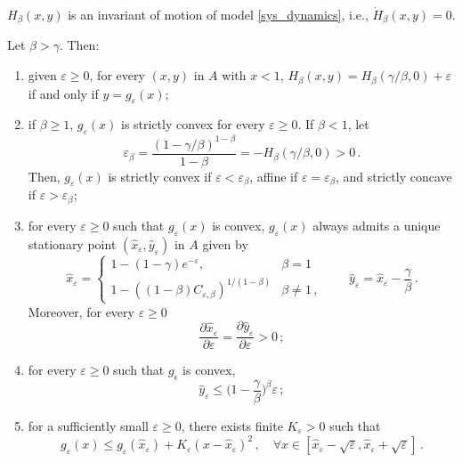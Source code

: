 \documentclass[10pt,a4paper]{amsart}
\begin{document}
\begin{proposition}\label{prop:H}
    $H_{\beta}(x,y)$ is an invariant of motion of model \eqref{sys_dynamics}, i.e., $\dot H_\beta(x,y) = 0$.
\end{proposition}

\begin{lemma}\label{lemma:g}
Let $\beta > \gamma$. Then: 
\begin{enumerate}
    \item[(i)] given $\varepsilon \ge 0$, for every $(x,y)$ in $A$ with $x < 1$, $H_\beta(x,y) = H_\beta(\gamma/\beta,0) + \varepsilon$ if and only if $y = g_\varepsilon(x)$;

    \item[(ii)] if $\beta \ge 1$, $g_\varepsilon(x)$ is strictly convex for every $\varepsilon \ge 0$. If $\beta < 1$, let
    $$
    \varepsilon_\beta = \frac{(1-\gamma/\beta)^{1-\beta}}{1-\beta} = -H_\beta(\gamma/\beta,0)>0\,.
    $$
Then, $g_\varepsilon(x)$ is strictly convex if $\varepsilon< \varepsilon_\beta$, affine if $\varepsilon = \varepsilon_\beta$, and strictly concave if $\varepsilon > \varepsilon_\beta$;

    \item[(iii)]
    for every $\varepsilon \ge 0$ such that $g_\varepsilon(x)$ is convex, $g_\varepsilon(x)$ always admits a unique stationary point $(\hat x_\varepsilon,\hat y_\varepsilon)$ in $A$ given by
    \begin{equation}\label{eq:xy}    
        \hat{x}_{\varepsilon} =\begin{cases}
        1 - (1 - \gamma)e^{- \varepsilon}, & \beta = 1\\
        1-((1-\beta)C_{\varepsilon,\beta})^{1/(1-\beta)}
        & \beta \neq 1\,,
        \end{cases}\qquad \hat{y}_{\varepsilon} = \hat x_\varepsilon - \frac{\gamma}{\beta}\,.
\end{equation}
Moreover, for every $\varepsilon \ge 0$
\begin{equation}\label{eq:mono}
\frac{\partial \hat x_\varepsilon}{\partial \varepsilon} = \frac{\partial \hat y_\varepsilon}{\partial \varepsilon} > 0\,;
\end{equation}
        \item[(iv)] for every $\varepsilon \ge 0$ such that $g_{\epsilon}$ is convex,
        \begin{equation*}
            \hat y_\varepsilon \leq \Big(1 - \displaystyle\frac{\gamma}{\beta}\Big)^{\beta}\varepsilon\,;
        \end{equation*}
        \item[(v)] for a sufficiently small $\varepsilon \ge 0$, there exists finite $K_\varepsilon>0$ such that
        $$
        g_{\varepsilon}(x) \leq g_{\varepsilon}(\hat{x}_{\varepsilon}) + K_\varepsilon (x-\hat{x}_{\varepsilon})^2\,, \quad \forall x \in [\hat{x}_{\varepsilon} - \sqrt{\varepsilon}, \hat{x}_{\varepsilon} + \sqrt{\varepsilon}]\,.
        $$
    \end{enumerate}
\end{lemma}
\end{document}
